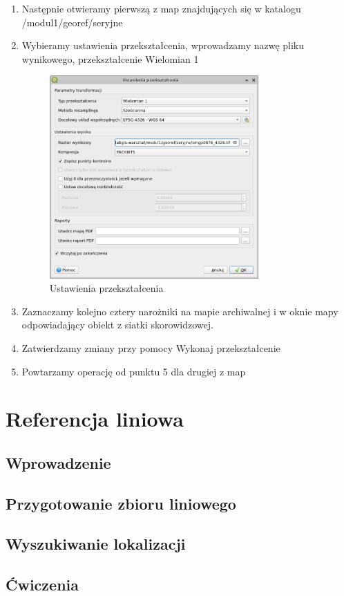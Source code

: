 \documentclass[a4paper,11pt, onecolumn, openany]{memoir}
\begin{document}
\begin{enumerate}
		\item Następnie otwieramy pierwszą z map znajdujących się w katalogu /modul1/georef/seryjne
		\item Wybieramy ustawienia przekształcenia, wprowadzamy nazwę pliku wynikowego, przekształcenie Wielomian 1
		\begin{figure}[!ht]
			\centering
			\includegraphics[width=8cm]{georef-ustawienia-skorowidz}
			\caption{Ustawienia przekształcenia}
		\end{figure}		
		\item Zaznaczamy kolejno cztery narożniki na mapie archiwalnej i w oknie mapy odpowiadający obiekt z siatki skorowidzowej.
		\item Zatwierdzamy zmiany przy pomocy Wykonaj przekształcenie
		\item Powtarzamy operację od punktu 5 dla drugiej z map
		\end{enumerate}

	\chapter{Referencja liniowa}
		\section{Wprowadzenie}
		\section{Przygotowanie zbioru liniowego}
		\section{Wyszukiwanie lokalizacji}
		\section{Ćwiczenia}
\end{document}
